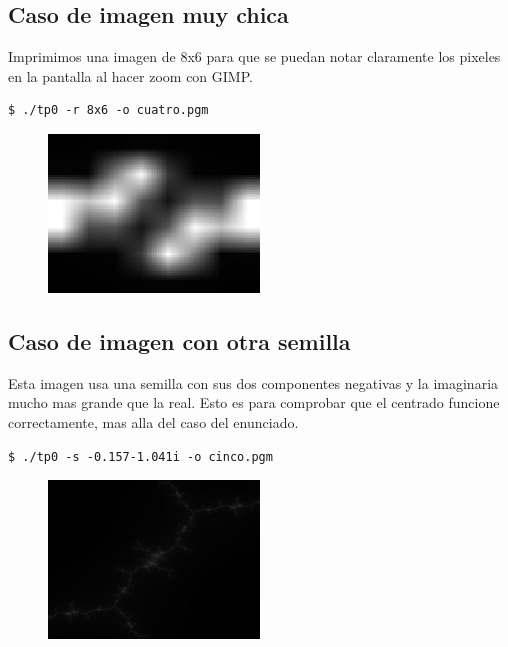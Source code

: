 \documentclass[a4paper,10pt]{article}
\begin{document}
\newpage

\subsection{Caso de imagen muy chica}

Imprimimos una imagen de 8x6 para que se puedan notar claramente los pixeles en la pantalla al hacer zoom con GIMP.

\begin{lstlisting}[frame=single]
$ ./tp0 -r 8x6 -o cuatro.pgm
\end{lstlisting}

\begin{figure}[H]
\begin{center}
\includegraphics[width=0.5\textwidth]{imagenes/cuatro.png}
\caption{} \label{cuatro}
\end{center}
\end{figure}

\subsection{Caso de imagen con otra semilla}

Esta imagen usa una semilla con sus dos componentes negativas y la imaginaria mucho mas grande que la real.
Esto es para comprobar que el centrado funcione correctamente, mas alla del caso del enunciado.
\begin{lstlisting}[frame=single]
$ ./tp0 -s -0.157-1.041i -o cinco.pgm
\end{lstlisting}

\begin{figure}[H]
\begin{center}
\includegraphics[width=0.5\textwidth]{imagenes/cinco.png}
\caption{} \label{cinco}
\end{center}
\end{figure}
\end{document}
